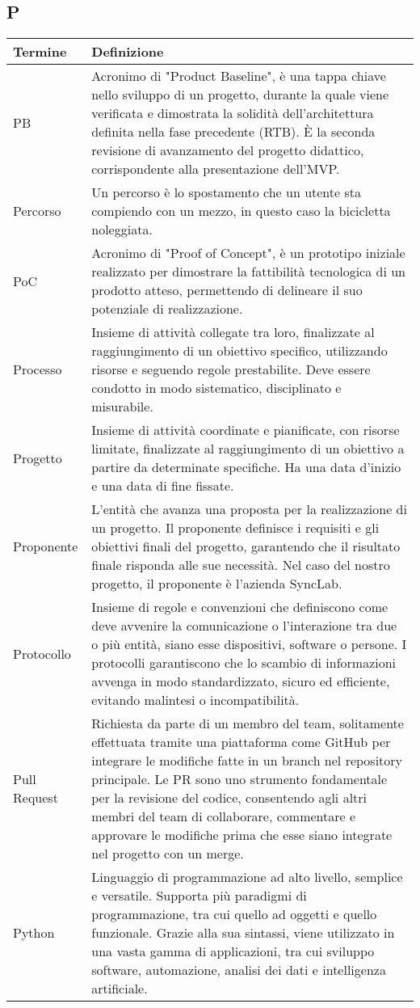 \documentclass[10pt]{article}
\begin{document}
\subsection{P} %
\begin{longtable}{|>{\centering\arraybackslash}m{2.5cm}|>{\arraybackslash}m{12.5cm}|}
\hline
\rowcolor[gray]{0.8}
\textbf{Termine} & \textbf{Definizione}\\
\endhead
\hline
PB & Acronimo di "Product Baseline", è una tappa chiave nello sviluppo di un progetto, durante la quale viene verificata e dimostrata la solidità dell'architettura definita nella fase precedente (RTB). È la seconda revisione di avanzamento del progetto didattico, corrispondente alla presentazione dell'MVP.\\
\hline
Percorso & Un percorso è lo spostamento che un utente sta compiendo con un mezzo, in questo caso la bicicletta noleggiata.\\
\hline
PoC & Acronimo di "Proof of Concept", è un prototipo iniziale realizzato per dimostrare la fattibilità tecnologica di un prodotto atteso, permettendo di delineare il suo potenziale di realizzazione.\\
\hline
Processo & Insieme di attività collegate tra loro, finalizzate al raggiungimento di un obiettivo specifico, utilizzando risorse e seguendo regole prestabilite. Deve essere condotto in modo sistematico, disciplinato e misurabile.\\
\hline
Progetto & Insieme di attività coordinate e pianificate, con risorse limitate, finalizzate al raggiungimento di un obiettivo a partire da determinate specifiche. Ha una data d'inizio e una data di fine fissate.\\
\hline
Proponente & L'entità che avanza una proposta per la realizzazione di un progetto. Il proponente definisce i requisiti e gli obiettivi finali del progetto, garantendo che il risultato finale risponda alle sue necessità. Nel caso del nostro progetto, il proponente è l'azienda SyncLab.\\
\hline
Protocollo & Insieme di regole e convenzioni che definiscono come deve avvenire la comunicazione o l'interazione tra due o più entità, siano esse dispositivi, software o persone. I protocolli garantiscono che lo scambio di informazioni avvenga in modo standardizzato, sicuro ed efficiente, evitando malintesi o incompatibilità.\\
\hline
Pull Request & Richiesta da parte di un membro del team, solitamente effettuata tramite una piattaforma come GitHub per integrare le modifiche fatte in un branch nel repository principale. Le PR sono uno strumento fondamentale per la revisione del codice, consentendo agli altri membri del team di collaborare, commentare e approvare le modifiche prima che esse siano integrate nel progetto con un merge.\\
\hline
Python & Linguaggio di programmazione ad alto livello, semplice e versatile. Supporta più paradigmi di programmazione, tra cui quello ad oggetti e quello funzionale. Grazie alla sua sintassi, viene utilizzato in una vasta gamma di applicazioni, tra cui sviluppo software, automazione, analisi dei dati e intelligenza artificiale.\\
\hline
\end{longtable}
\end{document}
